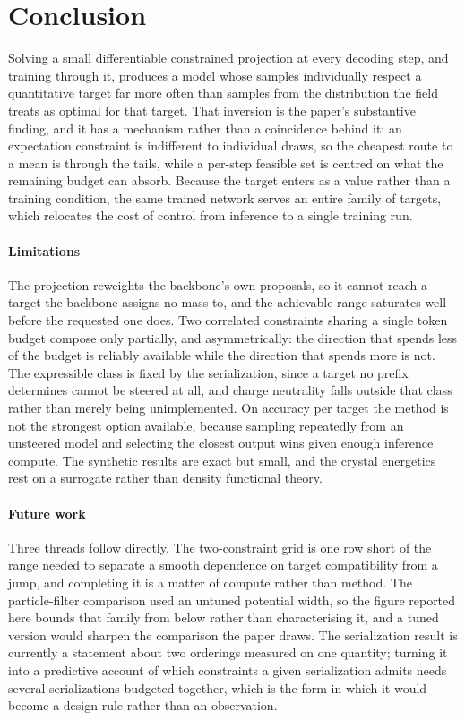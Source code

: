 \section{Conclusion}
\label{sec:conclusion}

Solving a small differentiable constrained projection at every decoding step, and training
through it, produces a model whose samples individually respect a quantitative target far
more often than samples from the distribution the field treats as optimal for that target.
That inversion is the paper's substantive finding, and it has a mechanism rather than a
coincidence behind it: an expectation constraint is indifferent to individual draws, so the
cheapest route to a mean is through the tails, while a per-step feasible set is centred on
what the remaining budget can absorb. Because the target enters as a value rather than a
training condition, the same trained network serves an entire family of targets, which
relocates the cost of control from inference to a single training run.

\paragraph{Limitations}
The projection reweights the backbone's own proposals, so it cannot reach a target the
backbone assigns no mass to, and the achievable range saturates well before the requested
one does. Two correlated constraints sharing a single token budget compose only partially,
and asymmetrically: the direction that spends less of the budget is reliably available
while the direction that spends more is not. The expressible class is fixed by the
serialization, since a target no prefix determines cannot be steered at all, and charge
neutrality falls outside that class rather than merely being unimplemented. On accuracy per
target the method is not the strongest option available, because sampling repeatedly from
an unsteered model and selecting the closest output wins given enough inference compute.
The synthetic results are exact but small, and the crystal energetics rest on a surrogate
rather than density functional theory.

\paragraph{Future work}
Three threads follow directly. The two-constraint grid is one row short of the range needed
to separate a smooth dependence on target compatibility from a jump, and completing it is a
matter of compute rather than method. The particle-filter comparison used an untuned
potential width, so the figure reported here bounds that family from below rather than
characterising it, and a tuned version would sharpen the comparison the paper draws. The
serialization result is currently a statement about two orderings measured on one quantity;
turning it into a predictive account of which constraints a given serialization admits needs
several serializations budgeted together, which is the form in which it would become a
design rule rather than an observation.

